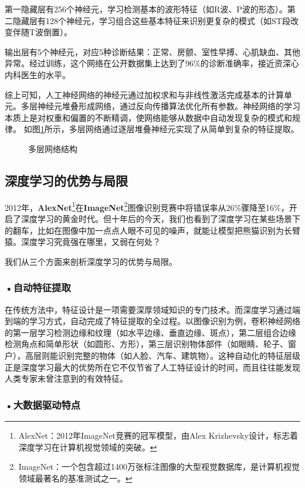 第一隐藏层有256个神经元，学习检测基本的波形特征（如R波、P波的形态）。第二隐藏层有128个神经元，学习组合这些基本特征来识别更复杂的模式（如ST段改变伴随T波倒置）。

输出层有5个神经元，对应5种诊断结果：正常、房颤、室性早搏、心肌缺血、其他异常。经过训练，这个网络在公开数据集上达到了96\%的诊断准确率，接近资深心内科医生的水平。

综上可知，人工神经网络的神经元通过加权求和与非线性激活完成基本的计算单元。多层神经元堆叠形成网络，通过反向传播算法优化所有参数。神经网络的学习本质上是对权重和偏置的不断精调，使网络能够从数据中自动发现复杂的模式和规律。
如图\ref{fig:ch2_2_11}所示，多层网络通过逐层堆叠神经元实现了从简单到复杂的特征提取。

\begin{figure}[H]
\centering
{}
\caption{多层网络结构}
\label{fig:ch2_2_11}
\end{figure}


\subsection{深度学习的优势与局限}
2012年，\textbf{AlexNet}\footnote{AlexNet：2012年ImageNet竞赛的冠军模型，由Alex Krizhevsky设计，标志着深度学习在计算机视觉领域的突破。}在\textbf{ImageNet}\footnote{ImageNet：一个包含超过1400万张标注图像的大型视觉数据库，是计算机视觉领域最著名的基准测试之一。}图像识别竞赛中将错误率从26\%骤降至16\%，开启了深度学习的黄金时代。但十年后的今天，我们也看到了深度学习在某些场景下的翻车，比如在图像中加一点点人眼不可见的噪声，就能让模型把熊猫识别为长臂猿。深度学习究竟强在哪里，又弱在何处？

我们从三个方面来剖析深度学习的优势与局限。

\subsubsection*{\textbf{•自动特征提取}}

在传统方法中，特征设计是一项需要深厚领域知识的专门技术。而深度学习通过端到端的学习方式，自动完成了特征提取的全过程。以图像识别为例，卷积神经网络的第一层学习检测边缘和纹理（如水平边缘、垂直边缘、斑点），第二层组合边缘检测角点和简单形状（如圆形、方形），第三层识别物体部件（如眼睛、轮子、窗户），高层则能识别完整的物体（如人脸、汽车、建筑物）。这种自动化的特征层级正是深度学习最大的优势所在它不仅节省了人工特征设计的时间，而且往往能发现人类专家未曾注意到的有效特征。

\subsubsection*{\textbf{•大数据驱动特点}}

